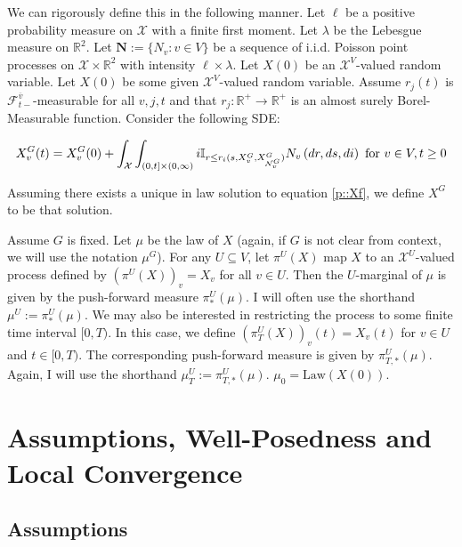 \documentclass[12pt]{article}
\newcommand{\mb}{\mathbb}
\newcommand{\mc}{\mathcal}
\newcommand{\ra}{\rightarrow}
\newcommand{\ov}{\overline}
\newcommand{\te}{\text}
\newcommand{\ind}{\hspace{24pt}}
\newcommand{\defeq}{:=}								%
\newcommand{\sta}{\mc{X}}							%
\newcommand{\gneigh}[2]{\mc{N}^{#1}_{#2}}			%
\newcommand{\cl}[1]{\ov{#1}}						%
\newcommand{\Xf}{X}									%
\newcommand{\poiss}{N}								%
\newcommand{\leb}{\lambda}							%
\newcommand{\Sm}{\ell}								%
\newcommand{\rate}{r}								%
\newcommand{\F}{\mc{F}}								%
\newcommand{\m}{\mu}								%
\newcommand{\proj}{\pi}								%
\newcommand{\poisses}{\mathbf{N}}					%
\newcommand{\poissv}[1]{_{#1}}						%
\newcommand{\vind}[1]{_{#1}}						%
\newcommand{\tme}[1]{(#1)}							%
\newcommand{\gind}[1]{^{#1}}						%
\newcommand{\vpara}[1]{^{#1}}						%
\newcommand{\stpara}[1]{_{#1}}						%
\newcommand{\tpara}[1]{_{#1}}						%
\newcommand{\psf}{_*}								%
\newcommand{\tparapsf}[1]{_{#1,*}}					%
\newcommand{\tmepro}[3]{
\ifstrempty{#3}{
	(#1,#2)}{
	(#1,#2,#3)}}									%
\newcommand{\law}{\te{Law}}							%
\begin{document}
\ind We can rigorously define this in the following manner. Let \(\Sm\) be a positive probability measure on \(\sta\) with a finite first moment. Let \(\leb\) be the Lebesgue measure on \(\mb{R}^2\). Let \(\poisses \defeq \{\poiss\poissv{v}:v \in V\}\) be a sequence of i.i.d. Poisson point processes on \(\sta\times \mb{R}^2\) with intensity \(\Sm\times \leb\). Let \(\Xf\tme{0}\) be an \(\sta^V\)-valued random variable. Let \(\Xf\tme{0}\) be some given \(\sta^V\)-valued random variable. Assume \(\rate\stpara{j}(t)\) is \(\F\vpara{\cl{v}}\tpara{t-}\)-measurable for all \(v,j,t\) and that \(\rate\stpara{j}:\mb{R}^+ \ra\mb{R}^+\) is an almost surely Borel-Measurable function. Consider the following SDE:

\begin{equation}
\Xf\gind{G}\vind{v}\tme{t} = \Xf\gind{G}\vind{v}\tme{0} + \int_{\sta}\int_{(0,t]\times (0,\infty)} i\mb{I}_{r \leq \rate\stpara{i}\tmepro{s}{\Xf\gind{G}\vind{v}}{\Xf\gind{G}\vind{\gneigh{G}{v}}}} \poiss\poissv{v}\left(dr,ds,di\right) \te{ for } v\in V, t \geq 0
\label{p::Xf}
\end{equation}

Assuming there exists a unique in law solution to equation \eqref{p::Xf}, we define \(\Xf\gind{G}\) to be that solution. 

\ind Assume \(G\) is fixed. Let \(\m\) be the law of \(\Xf\) (again, if \(G\) is not clear from context, we will use the notation \(\m\gind{G}\)). For any \(U \subseteq V\), let \(\proj\vpara{U}(\Xf)\) map \(\Xf\) to an \(\sta^U\)-valued process defined by \((\proj\vpara{U}(\Xf))\vind{v} = \Xf\vind{v}\) for all \(v\in U\). Then the \(U\)-marginal of \(\m\) is given by the push-forward measure \(\proj\vpara{U}\psf(\m)\). I will often use the shorthand \(\m\vpara{U} \defeq \proj\psf\vpara{U}(\m)\). We may also be interested in restricting the process to some finite time interval \([0,T)\). In this case, we define \((\proj\vpara{U}\tpara{T}(\Xf))\vind{v}\tme{t} = \Xf\vind{v}\tme{t}\) for \(v \in U\) and \(t \in [0,T)\). The corresponding push-forward measure is given by \(\proj\vpara{U}\tparapsf{T}(\m)\). Again, I will use the shorthand \(\m\vpara{U}\tpara{T} \defeq \proj\vpara{U}\tparapsf{T}(\m)\). \(\m\tpara{0} = \law(\Xf\tme{0})\).

\section{Assumptions, Well-Posedness and Local Convergence}
\label{awl}
\subsection{Assumptions}
\end{document}
